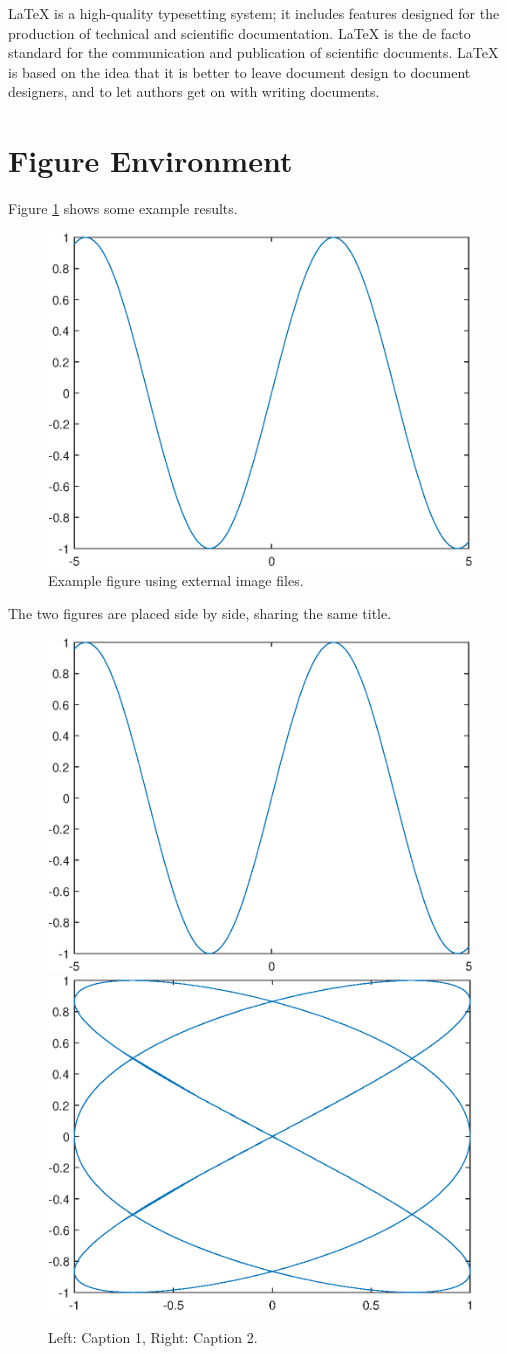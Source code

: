 \documentclass[openany,twoside,12pt]{book}
\theoremstyle{plain}
\numberwithin{equation}{chapter}
\numberwithin{figure}{chapter}
\numberwithin{table}{chapter}
\begin{document}
LaTeX is a high-quality typesetting system; it includes features designed
for the production of technical and scientific documentation.
LaTeX is the de facto standard for the communication and publication of scientific documents.
LaTeX is based on the idea that it is better to leave document design to
document designers, and to let authors get on with writing documents.


\section{Figure Environment}

Figure \ref{fig:a} shows some example results.
\begin{figure}[htp!]
  \centering
  \includegraphics[width=0.48\linewidth]{image1}
  \caption{Example figure using external image files.}
  \label{fig:a}
\end{figure}

\clearpage
The two figures are placed side by side, sharing the same title.
\begin{figure}[htp!]
  \centering
  \includegraphics[width=0.45\linewidth]{image1}
  \hfill
  \includegraphics[width=0.45\linewidth]{image2}
  \caption{Left: Caption 1, Right: Caption 2.}
  \label{fig:b}
\end{figure}
\end{document}
